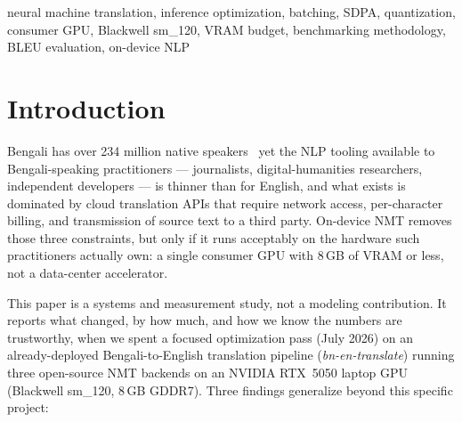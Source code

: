 \documentclass[conference]{IEEEtran}
\begin{document}
\begin{IEEEkeywords}
neural machine translation, inference optimization, batching, SDPA,
quantization, consumer GPU, Blackwell sm\_120, VRAM budget, benchmarking
methodology, BLEU evaluation, on-device NLP
\end{IEEEkeywords}

\section{Introduction}

Bengali has over 234 million native speakers~\cite{ethnologue2023} yet the
NLP tooling available to Bengali-speaking practitioners --- journalists,
digital-humanities researchers, independent developers --- is thinner than
for English, and what exists is dominated by cloud translation APIs that
require network access, per-character billing, and transmission of source
text to a third party. On-device NMT removes those three constraints, but
only if it runs acceptably on the hardware such practitioners actually own:
a single consumer GPU with 8\,GB of VRAM or less, not a data-center
accelerator.

This paper is a systems and measurement study, not a modeling contribution.
It reports what changed, by how much, and how we know the numbers are
trustworthy, when we spent a focused optimization pass (July 2026) on an
already-deployed Bengali-to-English translation pipeline
(\textit{bn-en-translate}) running three open-source NMT backends on an
NVIDIA RTX~5050 laptop GPU (Blackwell sm\_120, 8\,GB GDDR7). Three findings
generalize beyond this specific project:
\end{document}
